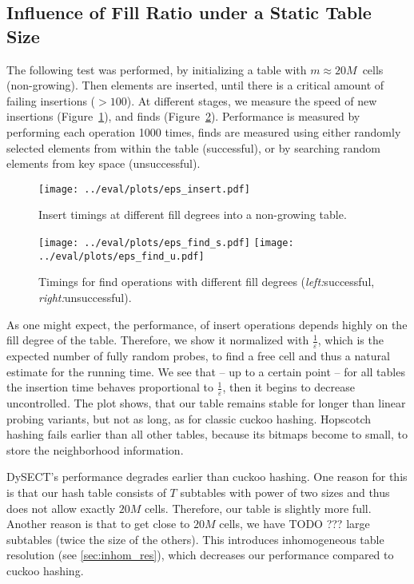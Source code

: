 \documentclass[a4paper,UKenglish]{lipics-v2016}
\begin{document}
\subsection{Influence of Fill Ratio under a Static Table Size}
\label{sec:exp_eps}

The following test was performed, by initializing a table with
$m\approx20M$~cells (non-growing). Then elements are inserted, until there
is a critical amount of failing insertions ($>100$).  At different
stages, we measure the speed of new insertions
(Figure~\ref{fig:eps_insert}), and finds (Figure~\ref{fig:eps_find}).
Performance is measured by performing each operation 1000 times, finds
are measured using either randomly selected elements from within the table (successful), or by
searching random elements from key space (unsuccessful).

\begin{figure}[ht]
  \centering
  \texttt{[image: ../eval/plots/eps\_insert.pdf]}
  \caption{\label{fig:eps_insert}Insert timings at different fill
    degrees into a non-growing table.}
\end{figure}
\begin{figure}[ht]
  \centering
  \texttt{[image: ../eval/plots/eps\_find\_s.pdf]}
  \texttt{[image: ../eval/plots/eps\_find\_u.pdf]}
  \caption{Timings for find operations with different fill degrees
    (\emph{left:}successful, \emph{right:}unsuccessful).}
  \label{fig:eps_find}
\end{figure}

As one might expect, the performance, of insert operations depends
highly on the fill degree of the table.  Therefore, we show it
normalized with $\frac{1}{\varepsilon}$, which is the expected number
of fully random probes, to find a free cell and thus a natural
estimate for the running time. We see that -- up to a certain point --
for all tables the insertion time behaves proportional to
$\frac{1}{\varepsilon}$, then it begins to decrease uncontrolled.  The
plot shows, that our table remains stable for longer than linear
probing variants, but not as long, as for classic cuckoo hashing.
Hopscotch hashing fails earlier than all other tables, because its
bitmaps become to small, to store the neighborhood information.

DySECT's performance degrades earlier than cuckoo hashing.  One reason
for this is that our hash table consists of $T$ subtables with power
of two sizes and thus does not allow exactly $20M$ cells.  Therefore,
our table is slightly more full.  Another reason is that to get close
to $20M$ cells, we have TODO ??? large subtables (twice the size of
the others).  This introduces inhomogeneous table resolution (see
\ref{sec:inhom_res}), which decreases our performance compared to
cuckoo hashing.
\end{document}
